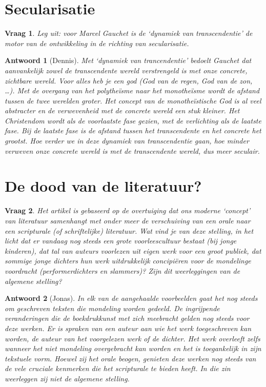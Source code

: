 \documentclass{article}
\theoremstyle{nonumberplain}
\newtheorem{question}{Vraag}
\newtheorem{answer}{Antwoord}
\begin{document}
\section{Secularisatie}

\begin{question}
Leg uit: voor Marcel Gauchet is de ‘dynamiek van transcendentie’ de motor van de
ontwikkeling in de richting van secularisatie.
\end{question}

\begin{answer}[Dennis]

Met `dynamiek van trancendentie' bedoelt Gauchet dat aanvankelijk zowel de
transcendente wereld verstrengeld is met onze concrete, zichtbare wereld. Voor
alles heb je een god (God van de regen, God van de zon, \dots). Met de overgang
van het polythe\"isme naar het monothe\"isme wordt de afstand tussen de twee
werelden groter. Het concept van de monothe\"istische God is al veel abstracter
en de verwevenheid met de concrete wereld een stuk kleiner. Het Christendom
wordt als de voorlaatste fase gezien, met de verlichting als de laatste fase.
Bij de laatste fase is de afstand tussen het transcendente en het concrete het
grootst. Hoe verder we in deze dynamiek van transcendentie gaan, hoe minder
verweven onze concrete wereld is met de transcendente wereld, dus meer seculair.

\end{answer}

\section{De dood van de literatuur?}

\begin{question}
Het artikel is gebaseerd op de overtuiging dat ons moderne ‘concept’ van
literatuur samenhangt met onder meer de verschuiving van een orale naar een
scripturale (of schriftelijke) literatuur. Wat vind je van deze stelling, in het
licht dat er vandaag nog steeds een grote voorleescultuur bestaat (bij jonge
kinderen), dat tal van auteurs voorlezen uit eigen werk voor een groot publiek,
dat sommige jonge dichters hun werk uitdrukkelijk concipiëren voor de mondelinge
voordracht (performerdichters en slammers)? Zijn dit weerleggingen van de
algemene stelling?
\end{question}

\begin{answer}[Jonas]

In elk van de aangehaalde voorbeelden gaat het nog steeds om geschreven teksten
die mondeling worden gedeeld. De ingrijpende veranderingen die de boekdrukkunst
met zich meebracht gelden nog steeds voor deze werken. Er is spraken van een
auteur aan wie het werk toegeschreven kan worden, de auteur van het voorgelezen
werk of de dichter. Het werk overleeft zelfs wanneer het niet mondeling
overgebracht kan worden en het is toegankelijk in zijn tekstuele vorm. Hoewel
zij het orale beogen, genieten deze werken nog steeds van de vele cruciale
kenmerken die het scripturale te bieden heeft. In die zin weerleggen zij niet de
algemene stelling.

\end{answer}
\end{document}
